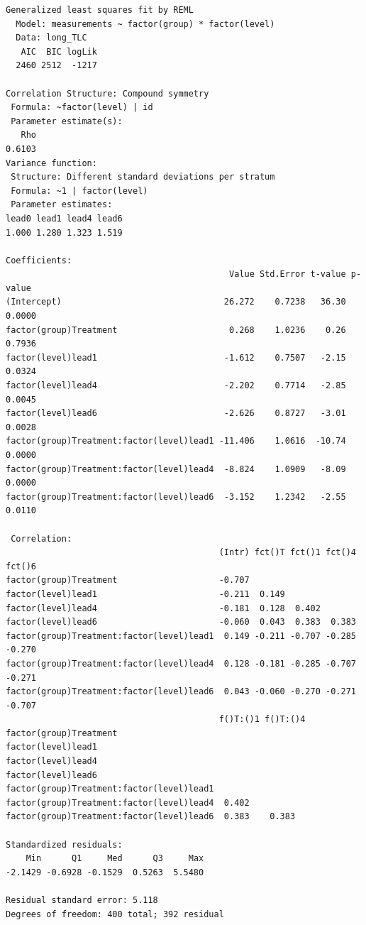 \documentclass[
  letterpaper,
  DIV=11,
  numbers=noendperiod]{scrreprt}
\begin{document}
\begin{verbatim}
Generalized least squares fit by REML
  Model: measurements ~ factor(group) * factor(level) 
  Data: long_TLC 
   AIC  BIC logLik
  2460 2512  -1217

Correlation Structure: Compound symmetry
 Formula: ~factor(level) | id 
 Parameter estimate(s):
   Rho 
0.6103 
Variance function:
 Structure: Different standard deviations per stratum
 Formula: ~1 | factor(level) 
 Parameter estimates:
lead0 lead1 lead4 lead6 
1.000 1.280 1.323 1.519 

Coefficients:
                                            Value Std.Error t-value p-value
(Intercept)                                26.272    0.7238   36.30  0.0000
factor(group)Treatment                      0.268    1.0236    0.26  0.7936
factor(level)lead1                         -1.612    0.7507   -2.15  0.0324
factor(level)lead4                         -2.202    0.7714   -2.85  0.0045
factor(level)lead6                         -2.626    0.8727   -3.01  0.0028
factor(group)Treatment:factor(level)lead1 -11.406    1.0616  -10.74  0.0000
factor(group)Treatment:factor(level)lead4  -8.824    1.0909   -8.09  0.0000
factor(group)Treatment:factor(level)lead6  -3.152    1.2342   -2.55  0.0110

 Correlation: 
                                          (Intr) fct()T fct()1 fct()4 fct()6
factor(group)Treatment                    -0.707                            
factor(level)lead1                        -0.211  0.149                     
factor(level)lead4                        -0.181  0.128  0.402              
factor(level)lead6                        -0.060  0.043  0.383  0.383       
factor(group)Treatment:factor(level)lead1  0.149 -0.211 -0.707 -0.285 -0.270
factor(group)Treatment:factor(level)lead4  0.128 -0.181 -0.285 -0.707 -0.271
factor(group)Treatment:factor(level)lead6  0.043 -0.060 -0.270 -0.271 -0.707
                                          f()T:()1 f()T:()4
factor(group)Treatment                                     
factor(level)lead1                                         
factor(level)lead4                                         
factor(level)lead6                                         
factor(group)Treatment:factor(level)lead1                  
factor(group)Treatment:factor(level)lead4  0.402           
factor(group)Treatment:factor(level)lead6  0.383    0.383  

Standardized residuals:
    Min      Q1     Med      Q3     Max 
-2.1429 -0.6928 -0.1529  0.5263  5.5480 

Residual standard error: 5.118 
Degrees of freedom: 400 total; 392 residual
\end{verbatim}
\end{document}
